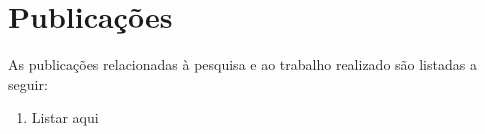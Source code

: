 \newpage
\thispagestyle{empty}
\chapter*{Publicações}

As publicações relacionadas à pesquisa e ao trabalho realizado são listadas a seguir:

\begin{enumerate}
    \item Listar aqui
\end{enumerate}

\newpage



